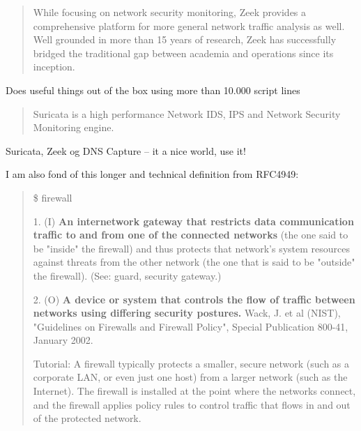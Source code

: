 \documentclass[Screen16to9,17pt]{foils}
\begin{document}


\begin{quote}
While focusing on network security monitoring, Zeek provides a comprehensive platform for more general network traffic analysis as well. Well grounded in more than 15 years of research, Zeek has successfully bridged the traditional gap between academia and operations since its inception.
\end{quote}

Does useful things out of the box using more than 10.000 script lines


\begin{quote}
Suricata is a high performance Network IDS, IPS and Network Security Monitoring engine.
\end{quote}


Suricata, Zeek og DNS Capture -- it a nice world, use it!\\
{\small{}}




I am also fond of this longer and technical definition from RFC4949:
\begin{quote}
\$ firewall

      1. (I) {\bf An internetwork gateway that restricts data communication
      traffic to and from one of the connected networks} (the one said to
      be "inside" the firewall) and thus protects that network's system
      resources against threats from the other network (the one that is
      said to be "outside" the firewall). (See: guard, security
      gateway.)

      2. (O) {\bf A device or system that controls the flow of traffic
      between networks using differing security postures.} Wack, J. et al (NIST), "Guidelines on Firewalls and Firewall Policy", Special Publication 800-41,
      January 2002.

      Tutorial: A firewall typically protects a smaller, secure network
      (such as a corporate LAN, or even just one host) from a larger
      network (such as the Internet). The firewall is installed at the
      point where the networks connect, and the firewall applies policy
      rules to control traffic that flows in and out of the protected
      network.
\end{quote}
\end{document}
